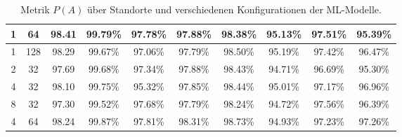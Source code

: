 \begin{table}[h!]
\begin{tabular}{ | c | c | c | c | c | c | c | c | c | c | }
        1 & 64 & 98.41 & 99.79\% & 97.78\% & 97.88\% & 98.38\% & 95.13\% & 97.51\% & 95.39\% \\\hline
        1 & 128 & 98.29 & 99.67\% & 97.06\% & 97.79\% & 98.50\% & 95.19\% & 97.42\% & 96.47\% \\\hline
        2 & 32 & 97.69 & 99.68\% & 97.34\% & 97.88\% & 98.43\% & 94.71\% & 96.69\% & 95.30\% \\\hline
        4 & 32 & 98.10 & 99.75\% & 95.32\% & 97.85\% & 98.44\% & 95.01\% & 97.17\% & 96.96\% \\\hline
        8 & 32 & 97.30 & 99.52\% & 97.68\% & 97.79\% & 98.24\% & 94.72\% & 97.56\% & 96.39\% \\\hline
        4 & 64 & 98.24 & 99.87\% & 97.81\% & 98.31\% & 98.73\% & 94.93\% & 97.23\% & 97.26\% \\\hline
    \end{tabular}
    \caption{Metrik $P(A)$ über Standorte und verschiedenen Konfigurationen der ML-Modelle.}
    \label{tab:predictions_by_acc}
\end{table}


